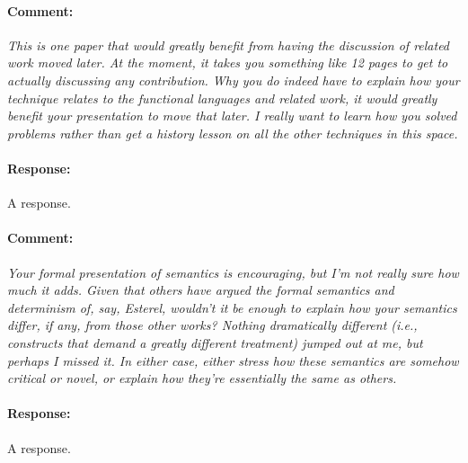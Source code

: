 \documentclass[a4paper,11pt]{article}
\newenvironment{comment}{\paragraph{Comment:}\em}{}
\newenvironment{response}{\paragraph{Response:}}{}
\begin{document}
\begin{comment}
	This is one paper that would greatly benefit from having the
	discussion of related work moved later. At the moment, it
	takes you something like 12 pages to get to actually
	discussing any contribution. Why you do indeed have to
	explain how your technique relates to the functional
	languages and related work, it would greatly benefit your
	presentation to move that later. I really want to learn how
	you solved problems rather than get a history lesson on all
	the other techniques in this space.
\end{comment}
\begin{response}
	A response.
\end{response}

\begin{comment}
	Your formal presentation of semantics is encouraging, but
	I'm not really sure how much it adds. Given that others have
	argued the formal semantics and determinism of, say,
	Esterel, wouldn't it be enough to explain how your semantics
	differ, if any, from those other works? Nothing dramatically
	different (i.e., constructs that demand a greatly different
	treatment) jumped out at me, but perhaps I missed it. In
	either case, either stress how these semantics are somehow
	critical or novel, or explain how they're essentially the
	same as others.
\end{comment}
\begin{response}
	A response.
\end{response}
\end{document}
